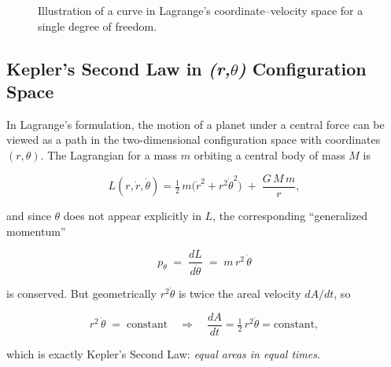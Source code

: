 \begin{figure}[H]
    \centering
    \caption{Illustration of a curve in Lagrange’s coordinate–velocity space for a single degree of freedom.}
\end{figure}




\subsection{Kepler’s Second Law in \emph{(r,\(\theta\))} Configuration Space}

In Lagrange’s formulation, the motion of a planet under a central force can be viewed as a path in the two-dimensional configuration space with coordinates \((r,\theta)\).  The Lagrangian for a mass \(m\) orbiting a central body of mass \(M\) is

\[
L(r,\dot r,\dot\theta)
=\tfrac12\,m\bigl(\dot r^2 + r^2\dot\theta^2\bigr)
\;+\;\frac{G\,M\,m}{r},
\]

and since \(\theta\) does not appear explicitly in \(L\), the corresponding “generalized momentum”

\[
p_\theta \;=\; \frac{dL}{d\dot\theta} \;=\; m\,r^2\,\dot\theta
\]

is conserved.  But geometrically \(r^2\dot\theta\) is twice the areal velocity \(dA/dt\), so

\[
r^2\,\dot\theta \;=\;\text{constant}
\quad\Longrightarrow\quad
\frac{dA}{dt}=\tfrac12\,r^2\dot\theta=\text{constant},
\]

which is exactly Kepler’s Second Law: \emph{equal areas in equal times}.  

